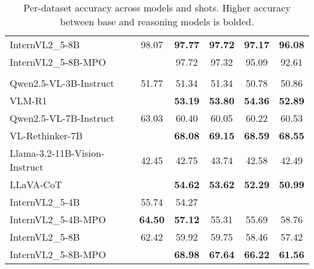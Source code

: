 \begin{table}[t]
\begin{tabular}{lccccc}
\midrule
{InternVL2\_5-8B} & 98.07 & \textbf{97.77} & \textbf{97.72} & \textbf{97.17} & \textbf{96.08} \\
{InternVL2\_5-8B-MPO} &  & 97.72 & 97.32 & 95.09 & 92.61 \\
\midrule
\rowcolor{gray!20} \multicolumn{6}{c}{\textbf{M3CoT}} \\
{Qwen2.5-VL-3B-Instruct} & 51.77 & 51.34 & 51.34 & 50.78 & 50.86 \\
{VLM-R1} &  & \textbf{53.19} & \textbf{53.80} & \textbf{54.36} & \textbf{52.89} \\
\midrule
{Qwen2.5-VL-7B-Instruct} & 63.03 & 60.40 & 60.05 & 60.22 & 60.53 \\
{VL-Rethinker-7B} &  & \textbf{68.08} & \textbf{69.15} & \textbf{68.59} & \textbf{68.55} \\
\midrule
{Llama-3.2-11B-Vision-Instruct} & 42.45 & 42.75 & 43.74 & 42.58 & 42.49 \\
{LLaVA-CoT} &  & \textbf{54.62} & \textbf{53.62} & \textbf{52.29} & \textbf{50.99} \\
\midrule
{InternVL2\_5-4B} & 55.74 & 54.27 &  &  &  \\
{InternVL2\_5-4B-MPO} & \textbf{64.50} & \textbf{57.12} & 55.31 & 55.69 & 58.76 \\
\midrule
{InternVL2\_5-8B} & 62.42 & 59.92 & 59.75 & 58.46 & 57.42 \\
{InternVL2\_5-8B-MPO} &  & \textbf{68.98} & \textbf{67.64} & \textbf{66.22} & \textbf{61.56} \\
\bottomrule
\end{tabular}
\caption{Per-dataset accuracy across models and shots. Higher accuracy between base and reasoning models is bolded.}
\label{tab:per_dataset_bolded}
\end{table}